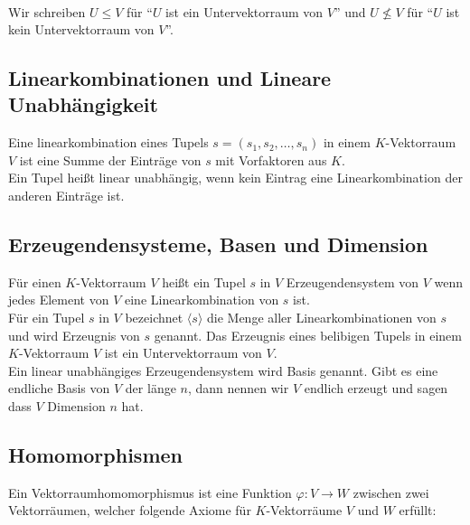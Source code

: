 \documentclass[11pt]{scrartcl}
\newlength{\hangwidth}
\newcommand{\skript}[1]{\settowidth{\hangwidth}{\textbf{(#1)} }\hangpara{\hangwidth}{1}\textbf{(#1)} }
\begin{document}

\begin{align*}
	\
\end{align*}

Wir schreiben $U \leq V$ für ``$U$ ist ein Untervektorraum von $V$'' und $U \nleq V$ für ``$U$ ist kein Untervektorraum von $V$''.

\subsection{Linearkombinationen und Lineare Unabhängigkeit}

Eine linearkombination eines Tupels $s = (s_1,s_2, \ldots, s_n)$ in einem $K$-Vektorraum $V$ ist eine Summe der Einträge von $s$ mit Vorfaktoren aus $K$.	\\
Ein Tupel heißt linear unabhängig, wenn kein Eintrag eine Linearkombination der anderen Einträge ist.

\subsection{Erzeugendensysteme, Basen und Dimension}

Für einen $K$-Vektorraum $V$ heißt ein Tupel $s$ in $V$ Erzeugendensystem von $V$ wenn jedes Element von $V$ eine Linearkombination von $s$ ist.	\\
Für ein Tupel $s$ in $V$ bezeichnet $\langle s \rangle$ die Menge aller Linearkombinationen von $s$ und wird Erzeugnis von $s$ genannt. Das Erzeugnis eines belibigen Tupels in einem $K$-Vektorraum $V$ ist ein Untervektorraum von $V$.	\\
Ein linear unabhängiges Erzeugendensystem wird Basis genannt. Gibt es eine endliche Basis von $V$ der länge $n$, dann nennen wir $V$ endlich erzeugt und sagen dass $V$ Dimension $n$ hat.

\subsection{Homomorphismen}

Ein Vektorraumhomomorphismus ist eine Funktion $\varphi : V \to W$ zwischen zwei Vektorräumen, welcher folgende Axiome für $K$-Vektorräume $V$ und $W$ erfüllt:
\end{document}
